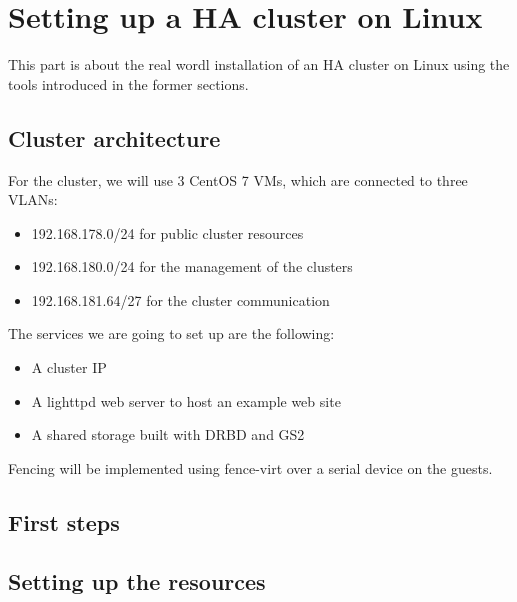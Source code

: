 \section{Setting up a HA cluster on Linux}
This part is about the real wordl installation of an \ac{HA} cluster on Linux using the tools introduced in the former sections.

\subsection{Cluster architecture}
For the cluster, we will use 3 CentOS 7 \acp{VM}, which are connected
to three \acp{VLAN}: 
\begin{itemize}
\item 192.168.178.0/24 for public cluster resources
\item 192.168.180.0/24 for the management of the clusters
\item 192.168.181.64/27 for the cluster communication
\end{itemize}
The services we are going to set up are the following:
\begin{itemize}
\item A cluster IP
\item A lighttpd web server to host an example web site
\item A shared storage built with DRBD and GS2
\end{itemize}

Fencing will be implemented using fence-virt over a serial device
on the guests.

\subsection{First steps}


\subsection{Setting up the resources}

